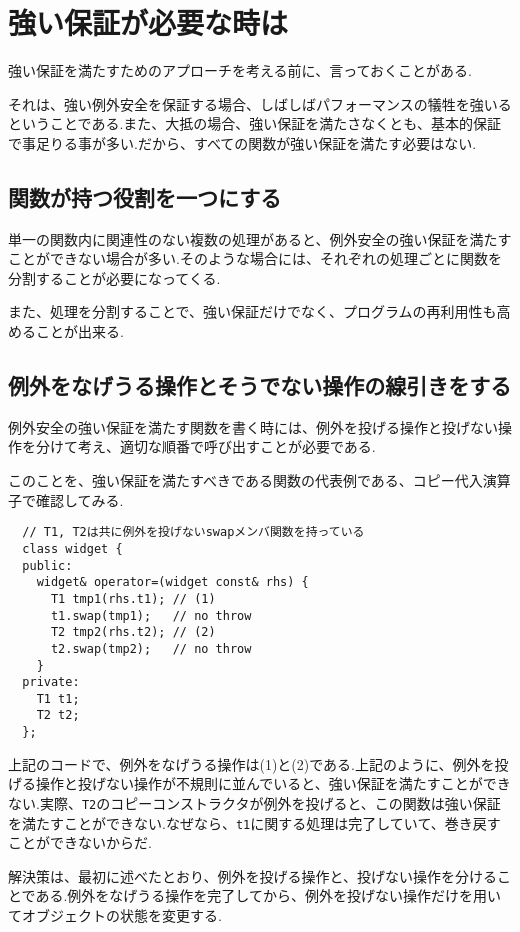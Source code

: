\documentclass[a4j,11pt,openright]{jsbook}
\begin{document}
\section{強い保証が必要な時は}

強い保証を満たすためのアプローチを考える前に、言っておくことがある.

それは、強い例外安全を保証する場合、しばしばパフォーマンスの犠牲を強いるということである.また、大抵の場合、強い保証を満たさなくとも、基本的保証で事足りる事が多い.だから、すべての関数が強い保証を満たす必要はない.

\subsection{関数が持つ役割を一つにする}

単一の関数内に関連性のない複数の処理があると、例外安全の強い保証を満たすことができない場合が多い.そのような場合には、それぞれの処理ごとに関数を分割することが必要になってくる.

また、処理を分割することで、強い保証だけでなく、プログラムの再利用性も高めることが出来る.

\subsection{例外をなげうる操作とそうでない操作の線引きをする}

例外安全の強い保証を満たす関数を書く時には、例外を投げる操作と投げない操作を分けて考え、適切な順番で呼び出すことが必要である.

このことを、強い保証を満たすべきである関数の代表例である、コピー代入演算子で確認してみる.

\begin{verbatim}
  // T1, T2は共に例外を投げないswapメンバ関数を持っている
  class widget {
  public:
    widget& operator=(widget const& rhs) {
      T1 tmp1(rhs.t1); // (1)
      t1.swap(tmp1);   // no throw
      T2 tmp2(rhs.t2); // (2)
      t2.swap(tmp2);   // no throw
    }
  private:
    T1 t1;
    T2 t2;
  };
\end{verbatim}

上記のコードで、例外をなげうる操作は(1)と(2)である.上記のように、例外を投げる操作と投げない操作が不規則に並んでいると、強い保証を満たすことができない.実際、\verb|T2|のコピーコンストラクタが例外を投げると、この関数は強い保証を満たすことができない.なぜなら、\verb|t1|に関する処理は完了していて、巻き戻すことができないからだ.

解決策は、最初に述べたとおり、例外を投げる操作と、投げない操作を分けることである.例外をなげうる操作を完了してから、例外を投げない操作だけを用いてオブジェクトの状態を変更する.
\end{document}
